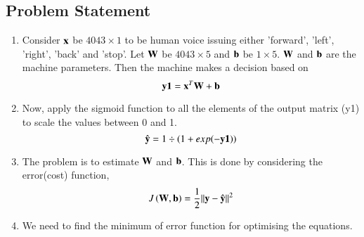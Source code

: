 \documentclass[journal,12pt,twocolumn]{IEEEtran}
\renewcommand\thesection{\arabic{section}}
\renewcommand\thesubsection{\thesection.\arabic{subsection}}
\begin{document}
\subsection{Problem Statement}
\begin{enumerate}[label=\thesubsection.\arabic*
,ref=\thesection.\theenumi]
\item Consider $\mathbf{x}$ be $4043 \times 1$ to be human voice issuing either 'forward', 'left', 
'right', 'back'  and 
'stop'.  Let $\mathbf{W}$ be $4043 \times 5$ and $\mathbf{b}$ be $1 \times 5$. $\mathbf{W}$ and $\mathbf{b}$ 
are the machine parameters. Then the machine makes a decision based on
\begin{equation}
\label{eq:model}
\mathbf{y1} = \mathbf{x}^{T}\mathbf{W}+ \mathbf{b}
\end{equation}
\item Now, apply the sigmoid function to all the elements of the output matrix (y1) to scale the values between 0 and 1.
\begin{equation}
\label{eq:model}
\hat{\mathbf{y}} = 1\div(1+exp(-\mathbf{y1}))
\end{equation}
\item The problem is to estimate $\mathbf{W}$ and $\mathbf{b}$.  This is done by considering the error(cost) function,  
\begin{equation}
\label{eq:cost}
J\left(\mathbf{W},\mathbf{b}\right)  = \frac{1}{2}\lVert\mathbf{y}-\hat{\mathbf{y}}\rVert^2
\end{equation}
\item We need to find the minimum of error function for optimising the equations.
\end{enumerate}
\end{document}
